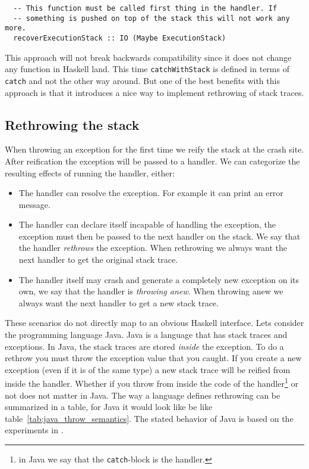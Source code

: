 \begin{verbatim}
  -- This function must be called first thing in the handler. If
  -- something is pushed on top of the stack this will not work any more.
  recoverExecutionStack :: IO (Maybe ExecutionStack)
\end{verbatim}

This approach will not break backwards compatibility since it does not
change any function in Haskell land. This time \texttt{catchWithStack}
is defined in terms of \texttt{catch} and not the other way around.
But one of the best benefits with this approach is that it introduces a
nice way to implement rethrowing of stack traces.



\subsection{Rethrowing the stack} \label{sec:rethrowing_the_stack}

When throwing an exception for the first time we reify the stack
at the crash site. After reification the exception will be passed to a handler.
We can categorize the resulting effects of running the handler, either:

\begin{itemize}
  \item
    The handler can resolve the exception. For example it can print an
    error message.

  \item
    The handler can declare itself incapable of handling the exception,
    the exception must then be passed to the next handler on the stack.
    We say that the handler \emph{rethrows} the exception. When
    rethrowing we always want the next handler to get the original stack
    trace.

  \item
    The handler itself may crash and generate a completely new exception
    on its own, we say that the handler is \emph{throwing anew}. When
    throwing anew we always want the next handler to get a new stack
    trace.

\end{itemize}

These scenarios do not directly map to an obvious Haskell
interface. Lets consider the programming language Java. Java is a
language that has stack traces and exceptions. In Java, the stack traces
are stored \emph{inside} the exception. To do a rethrow you must throw
the exception value that you caught. If you create a new exception (even
if it is of the same type) a new stack trace will be reified from inside
the handler. Whether if you throw from inside the code of the
handler\footnote{in Java we say that the \texttt{catch}-block is the handler.}
or not does not matter in Java. The way a language defines rethrowing can be summarized
in a table, for Java it would look like be like table~\ref{tab:java_throw_semantics}. The
stated behavior of Java is based on the experiments in \cite{github_gist_in_out_java}.

